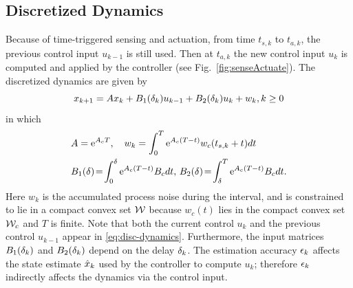 \subsection{Discretized Dynamics}
Because of time-triggered sensing and actuation, from time $t_{s,k}$ to $t_{a,k}$, the  previous control input $u_{k-1}$
is still used.
Then at $t_{a,k}$ the new control input $u_{k}$
is computed and applied by the controller (see Fig.~\ref{fig:senseActuate}).
The discretized dynamics are given by
\begin{equation}
\label{eq:disc-dynamics}
x_{k+1}=Ax_{k}+B_{1}(\delta_k)u_{k-1}+B_{2}(\delta_k)u_{k}+w_{k}, k\geq0
\end{equation}
in which
\begin{eqnarray*}
&A=\eu^{A_{c}T}, \quad
w_{k}%
=\int_{0}^{T}\eu^{A_{c}(T-t)}w_{c}(t_{s,k}+t) dt
\\
&B_{1}(\sDelay)%
\!=\!\int_{0}^{\sDelay}\eu^{A_{c}(T-t)}B_{c} dt,\,
B_{2}(\sDelay)%
\!=\!\int_{\sDelay}^{T}\eu^{A_{c}(T-t)}B_{c} dt \text.
\end{eqnarray*}
Here $w_{k}$ is the accumulated process noise during the interval, and is constrained to lie in a compact convex set $\mathcal{W}$ because $w_c(t)$ lies in the compact convex set $\mathcal{W}_c$ and $T$ is finite.
Note that both the current control $u_{k}$ and the previous
control $u_{k-1}$ appear in \eqref{eq:disc-dynamics}.
Furthermore, the input matrices $B_{1}(\delta_k)$ and $B_{2}(\delta_k)$
depend on the delay $\delta_k$.
The estimation accuracy $\epsilon_k$ affects the state estimate
$\hat{x}_{k}$ %
used by the controller to compute $u_{k}$;
therefore $\epsilon_k$ indirectly affects the dynamics via the control
input.







